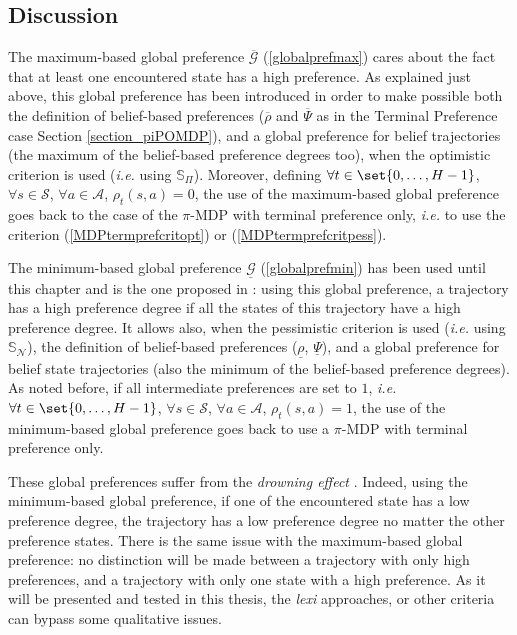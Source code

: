 \subsection{Discussion}
\label{subsection_discuss}
The maximum-based global preference $\overline{\mathcal{G}}$ (\ref{globalprefmax}) cares about 
the fact that at least one encountered state has a high preference.
As explained just above, 
this global preference has been introduced 
in order to make possible both the definition of belief-based preferences 
($\overline{\rho}$ and $\overline{\Psi}$ 
as in the Terminal Preference case Section \ref{section_piPOMDP}),
and a global preference for belief trajectories 
(the maximum of the belief-based preference degrees too), 
when the optimistic criterion is used (\textit{i.e.} using $\mathbb{S}_{\Pi}$).
Moreover, defining $\forall t \in \set{0,\ldots,H-1}$, $\forall s\in \mathcal{S}$, $\forall a\in\mathcal{A}$, $\rho_t(s,a) = 0$,
the use of the maximum-based global preference 
goes back to the case of the $\pi$-MDP with terminal preference only,
\textit{i.e.} to use the criterion (\ref{MDPtermprefcritopt})
or (\ref{MDPtermprefcritpess}).

The minimum-based global preference $\underline{\mathcal{G}}$ (\ref{globalprefmin}) 
has been used until this chapter
and is the one proposed in \cite{Sabbadin2001287,conf/ecai/Sabbadi00,Sabbadin:1999:pipomdp}: using this global preference,
a trajectory has a high preference degree 
if all the states of this trajectory have a high preference degree. 
It allows also, when the pessimistic criterion is used (\textit{i.e.} using $\mathbb{S}_{\mathcal{N}}$), the definition of belief-based preferences ($\underline{\rho}$, $\underline{\Psi}$),
and a global preference for belief state trajectories 
(also the minimum of the belief-based preference degrees).
As noted before, if all intermediate preferences are set to $1$,
\textit{i.e.} $\forall t \in \set{0,\ldots,H-1}$, $\forall s\in \mathcal{S}$, $\forall a\in\mathcal{A}$, $\rho_t(s,a) = 1$,
the use of the minimum-based global preference 
goes back to use a $\pi$-MDP with terminal preference only.

These global preferences suffer from the \textit{drowning effect} \cite{didierhelene}.
Indeed, using the minimum-based global preference, 
if one of the encountered state has a low preference degree,
the trajectory has a low preference degree no matter the other preference states.
There is the same issue with the maximum-based global preference:
no distinction will be made between a trajectory 
with only high preferences, and a trajectory 
with only one state with a high preference.
As it will be presented and tested in this thesis, 
the \textit{lexi} approaches, or other criteria \cite{LIP61723}
can bypass some qualitative issues. 


